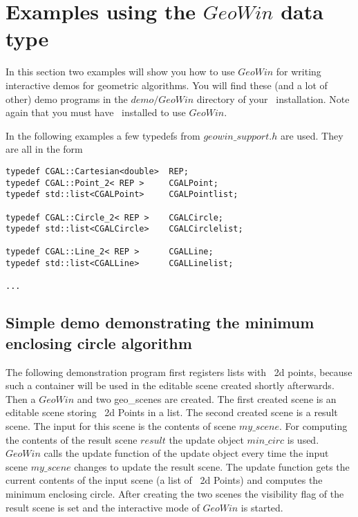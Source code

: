 \section{Examples using the $GeoWin$ data type}

In this section two examples will show you how to use $GeoWin$ for writing interactive 
demos for geometric algorithms. You will find these (and a lot of other) demo programs in the
$demo/GeoWin$ directory of your \cgal\ installation. Note again that you must have \leda\ installed
to use $GeoWin$.

In the following examples a few typedefs from $geowin\_support.h$ are used.
They are all in the form

\begin{verbatim}
typedef CGAL::Cartesian<double>  REP;
typedef CGAL::Point_2< REP >     CGALPoint;
typedef std::list<CGALPoint>     CGALPointlist;

typedef CGAL::Circle_2< REP >    CGALCircle;
typedef std::list<CGALCircle>    CGALCirclelist;

typedef CGAL::Line_2< REP >      CGALLine;
typedef std::list<CGALLine>      CGALLinelist;

...

\end{verbatim}

\subsection{Simple demo demonstrating the minimum enclosing circle algorithm}

The following demonstration program first registers lists with \cgal\ 2d points, because such a container
will be used in the editable scene created shortly afterwards.
Then a $GeoWin$ and two geo\_scenes are created.
The first created scene is an editable scene storing \cgal\ 2d Points in a list. The second created scene
is a result scene. The input for this scene is the contents of scene $my\_scene$. For computing the contents
of the result scene $result$ the update object $min\_circ$ is used. $GeoWin$ calls the update function 
of the update object every time the input scene $my\_scene$ changes to update the result scene.
The update function gets the current contents of the input scene (a list of
\cgal\ 2d Points) and
computes the minimum enclosing circle.
After creating the two scenes the visibility flag of the result scene is set and the interactive mode
of $GeoWin$ is started.

\ccHtmlLinksOff

